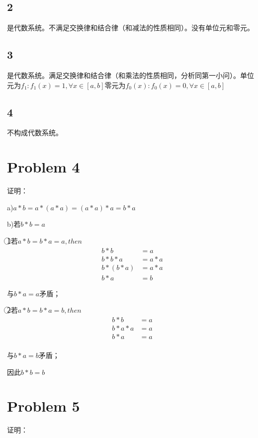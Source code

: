 \documentclass{article}
\begin{document}
\subsection*{2}
是代数系统。不满足交换律和结合律（和减法的性质相同）。没有单位元和零元。

\subsection*{3}
是代数系统。满足交换律和结合律（和乘法的性质相同，分析同第一小问）。单位元为$f_1:f_1(x)=1,\forall x\in [a,b]$零元为$f_0(x):f_0(x)=0,\forall x\in [a,b]$

\subsection*{4}
不构成代数系统。

\section*{Problem 4}
证明：

a)$a*b=a*(a*a)=(a*a)*a=b*a$

b)若$b*b=a$


\textcircled{1}若$a*b=b*a=a,then$
\begin{equation}
    \nonumber
    \begin{split}
        b*b&=a\\
        b*b*a&=a*a\\
        b*(b*a)&=a*a\\
        b*a&=b
    \end{split}
\end{equation}

与$b*a=a$矛盾；

\textcircled{2}若$a*b=b*a=b,then$
\begin{equation}
    \nonumber
    \begin{split}
        b*b&=a\\
        b*a*a&=a\\
        b*a&=a\\    
    \end{split}
\end{equation}

与$b*a=b$矛盾；

因此$b*b=b$
\section*{Problem 5}
证明：
\end{document}
